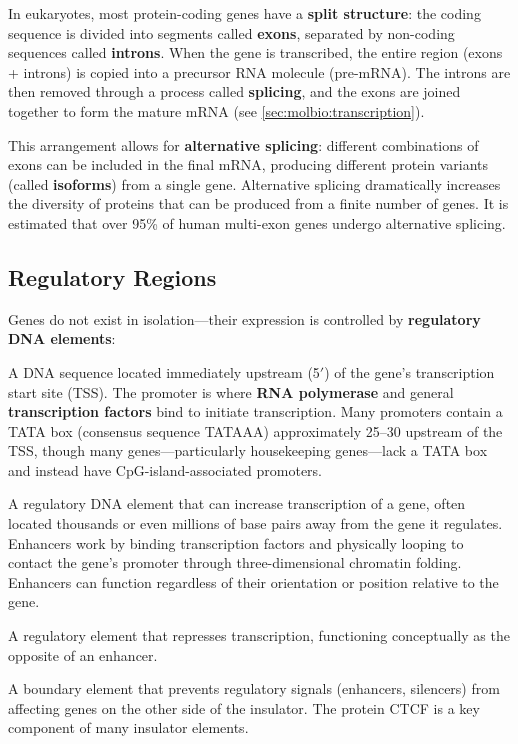 In eukaryotes, most protein-coding genes have a \textbf{split structure}: the coding sequence is divided into segments called \textbf{exons}, separated by non-coding sequences called \textbf{introns}. When the gene is transcribed, the entire region (exons + introns) is copied into a precursor RNA molecule (pre-mRNA). The introns are then removed through a process called \textbf{splicing}, and the exons are joined together to form the mature mRNA (see \cref{sec:molbio:transcription}).

This arrangement allows for \textbf{alternative splicing}: different combinations of exons can be included in the final mRNA, producing different protein variants (called \textbf{isoforms}) from a single gene. Alternative splicing dramatically increases the diversity of proteins that can be produced from a finite number of genes. It is estimated that over 95\% of human multi-exon genes undergo alternative splicing.

\subsection{Regulatory Regions}
\label{subsec:molbio:regulatory-regions}

Genes do not exist in isolation---their expression is controlled by \textbf{regulatory DNA elements}:

\begin{description}[style=nextline, itemsep=3pt]
  \item[Promoter] A DNA sequence located immediately upstream (5$'${}) of the gene's transcription start site (TSS). The promoter is where \textbf{RNA polymerase} and general \textbf{transcription factors} bind to initiate transcription. Many promoters contain a TATA box (consensus sequence TATAAA) approximately 25--30\basepair{} upstream of the TSS, though many genes---particularly housekeeping genes---lack a TATA box and instead have CpG-island-associated promoters.

  \item[Enhancer] A regulatory DNA element that can increase transcription of a gene, often located thousands or even millions of base pairs away from the gene it regulates. Enhancers work by binding transcription factors and physically looping to contact the gene's promoter through three-dimensional chromatin folding. Enhancers can function regardless of their orientation or position relative to the gene.

  \item[Silencer] A regulatory element that represses transcription, functioning conceptually as the opposite of an enhancer.

  \item[Insulator] A boundary element that prevents regulatory signals (enhancers, silencers) from affecting genes on the other side of the insulator. The protein CTCF is a key component of many insulator elements.
\end{description}

